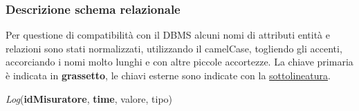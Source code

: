 \subsubsection{Descrizione schema relazionale}

Per questione di compatibilità con il DBMS alcuni nomi di attributi entità e relazioni sono stati normalizzati, utilizzando il camelCase, togliendo gli accenti, accorciando i nomi molto lunghi e con altre piccole accortezze.
La chiave primaria è indicata in \textbf{grassetto}, le chiavi esterne sono indicate con la \underline{sottolineatura}.

\textit{Log}(\textbf{idMisuratore}, \textbf{time}, valore, tipo)